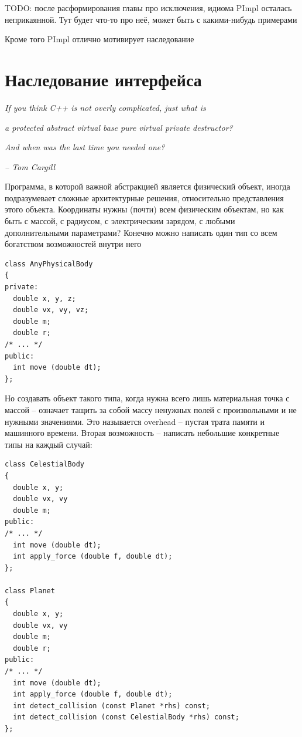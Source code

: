 \documentclass[a4paper,12pt,oneside]{book}
\begin{document}
TODO: после расформирования главы про исключения, идиома PImpl осталась неприкаянной. Тут будет что-то про неё, может быть с какими-нибудь примерами

Кроме того PImpl отлично мотивирует наследование
\fi

\pagebreak
\section{Наследование интерфейса}\label{IntfInheritance}

\hfill\textit{If you think C++ is not overly complicated, just what is} 

\hfill\textit{a protected abstract virtual base pure virtual private destructor?}

\hfill\textit{And when was the last time you needed one?}{\vspace{0.5em}}

\hfill\textit{-- Tom Cargill}

Программа, в которой важной абстракцией является физический объект, иногда подразумевает сложные архитектурные решения, относительно представления этого объекта. Координаты нужны (почти) всем физическим объектам, но как быть с массой, с радиусом, с электрическим зарядом, с любыми дополнительными параметрами? Конечно можно написать один тип со всем богатством возможностей внутри него

\begin{lstlisting}
class AnyPhysicalBody
{
private:
  double x, y, z;
  double vx, vy, vz;
  double m;
  double r;
/* ... */
public:
  int move (double dt);
};
\end{lstlisting}

Но создавать объект такого типа, когда нужна всего лишь материальная точка с массой -- означает тащить за собой массу ненужных полей с произвольными и не нужными значениями. Это называется overhead -- пустая трата памяти и машинного времени. Вторая возможность -- написать небольшие конкретные типы на каждый случай:

\begin{lstlisting}
class CelestialBody
{
  double x, y;
  double vx, vy
  double m;
public:
/* ... */
  int move (double dt);
  int apply_force (double f, double dt);
};

class Planet
{
  double x, y;
  double vx, vy
  double m;
  double r;
public:
/* ... */
  int move (double dt);
  int apply_force (double f, double dt);
  int detect_collision (const Planet *rhs) const;
  int detect_collision (const CelestialBody *rhs) const;
};
\end{lstlisting}
\end{document}
